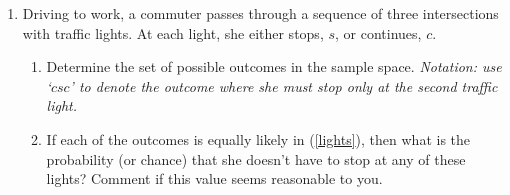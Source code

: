\begin{enumerate}
  \item
    Driving to work, a commuter passes through a sequence of three
    intersections with traffic lights. At each light, she either stops, $s$, or continues, $c$.
    \begin{enumerate}
      \item %
        \label{lights}
        Determine the set of possible outcomes in the sample space.
        \emph{Notation: use `$csc$' to denote the outcome where she must stop only at the second traffic light.}



      \item %
        If each of the outcomes is equally likely in (\ref{lights}), then
        what is the probability (or chance) that she doesn't have to stop at any of these lights?
        Comment if  this value seems reasonable to you.


\end{enumerate}
\end{enumerate}
